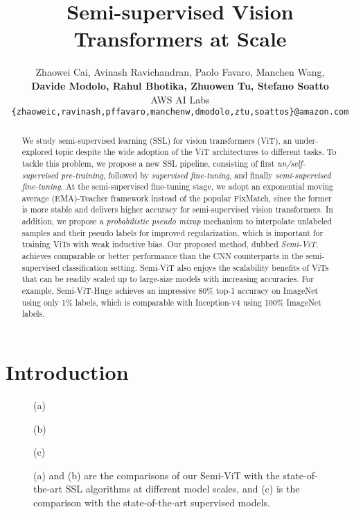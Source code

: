 \documentclass{article}
\title{Semi-supervised Vision Transformers at Scale}
\author{
Zhaowei Cai, Avinash Ravichandran, Paolo Favaro, Manchen Wang, \\ \textbf{Davide Modolo, Rahul Bhotika, Zhuowen Tu, Stefano Soatto} \\
AWS AI Labs \\
\texttt{\{zhaoweic,ravinash,pffavaro,manchenw,dmodolo,ztu,soattos\}@amazon.com} \\
}
\begin{document}
\maketitle


\begin{abstract}
  We study semi-supervised learning (SSL) for vision transformers (ViT), an under-explored topic despite the wide adoption of the ViT architectures to different tasks.
  To tackle this problem, we propose a new SSL pipeline, consisting of first \emph{un/self-supervised pre-training}, followed by \emph{supervised fine-tuning}, and finally \emph{semi-supervised fine-tuning}. At the semi-supervised fine-tuning stage, we adopt an exponential moving average (EMA)-Teacher framework instead of the popular FixMatch, since the former is more stable and delivers higher accuracy for semi-supervised vision transformers. In addition, we propose a \emph{probabilistic pseudo mixup} mechanism to interpolate unlabeled samples and their pseudo labels for improved regularization, which is important for training ViTs with weak inductive bias. Our proposed method, dubbed \emph{Semi-ViT}, achieves comparable or better performance than the CNN counterparts in the semi-supervised classification setting. Semi-ViT also enjoys the scalability benefits of ViTs that can be readily scaled up to large-size models with increasing accuracies. For example, Semi-ViT-Huge achieves an impressive 80\% top-1 accuracy on ImageNet using only 1\% labels, which is comparable with Inception-v4 using 100\% ImageNet labels.
\end{abstract}


\section{Introduction}


\begin{figure*}[h!]
\begin{minipage}[b]{.31\linewidth}
\centering
\centerline{}{(a)}
\end{minipage}
\hfill
\begin{minipage}[b]{.31\linewidth}
\centering
\centerline{}{(b)}
\end{minipage}
\hfill
\begin{minipage}[b]{.36\linewidth}
\centering
\centerline{}{(c)}
\end{minipage}
\caption{(a) and (b) are the comparisons of our Semi-ViT with the state-of-the-art SSL algorithms at different model scales, and (c) is the comparison with the state-of-the-art supervised models.}
\label{fig:sota}
\end{figure*}
\end{document}

